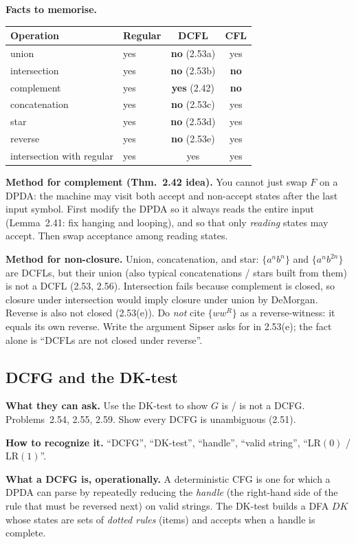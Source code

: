 \documentclass[11pt,a4paper]{article}
\begin{document}
\textbf{Facts to memorise.}
\begin{center}
\begin{tabular}{@{}llcc@{}}
\toprule
Operation & Regular & DCFL & CFL \\
\midrule
union & yes & \textbf{no} (2.53a) & yes \\
intersection & yes & \textbf{no} (2.53b) & \textbf{no} \\
complement & yes & \textbf{yes} (2.42) & \textbf{no} \\
concatenation & yes & \textbf{no} (2.53c) & yes \\
star & yes & \textbf{no} (2.53d) & yes \\
reverse & yes & \textbf{no} (2.53e) & yes \\
intersection with regular & yes & yes & yes \\
\bottomrule
\end{tabular}
\end{center}

\textbf{Method for complement (Thm.~2.42 idea).}
You cannot just swap $F$ on a DPDA: the machine may visit both
accept and non-accept states after the last input symbol. First
modify the DPDA so it always reads the entire input
(Lemma~2.41: fix hanging and looping), and so that only
\emph{reading} states may accept. Then swap acceptance among
reading states.

\textbf{Method for non-closure.}
Union, concatenation, and star: $\{a^nb^n\}$ and $\{a^nb^{2n}\}$
are DCFLs, but their union (also typical concatenations / stars
built from them) is not a DCFL (2.53, 2.56). Intersection fails
because complement is closed, so closure under intersection would
imply closure under union by DeMorgan. Reverse is also not closed
(2.53(e)). Do \emph{not} cite $\{ww^R\}$ as a reverse-witness: it
equals its own reverse. Write the argument Sipser asks for in
2.53(e); the fact alone is ``DCFLs are not closed under reverse''.

\subsection{DCFG and the DK-test}

\textbf{What they can ask.}
Use the DK-test to show $G$ is / is not a DCFG. Problems~2.54,
2.55, 2.59. Show every DCFG is unambiguous (2.51).

\textbf{How to recognize it.}
``DCFG'', ``DK-test'', ``handle'', ``valid string'',
``LR$(0)$ / LR$(1)$''.

\textbf{What a DCFG is, operationally.}
A deterministic CFG is one for which a DPDA can parse by
repeatedly reducing the \emph{handle} (the right-hand side of the
rule that must be reversed next) on valid strings. The DK-test
builds a DFA $DK$ whose states are sets of \emph{dotted rules}
(items) and accepts when a handle is complete.
\end{document}
